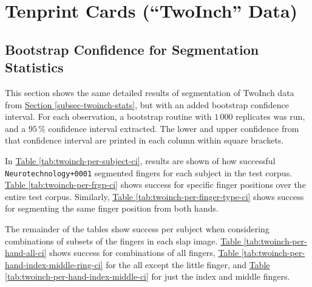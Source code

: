 \documentclass[]{article}
\begin{document}
\clearpage

\appendix


\section{\texorpdfstring{Tenprint Cards (``TwoInch''
Data)}{Tenprint Cards (TwoInch Data)}}\label{tenprint-cards-twoinch-data-1}

\subsection{Bootstrap Confidence for Segmentation
Statistics}\label{bootstrap-confidence-for-segmentation-statistics}

This section shows the same detailed results of segmentation of TwoInch
data from \protect\hyperlink{subsec-twoinch-stats}{Section
\ref{subsec-twoinch-stats}}, but with an added bootstrap confidence
interval. For each observation, a bootstrap routine with \(1\,000\)
replicates was run, and a \(95\,\%\) confidence interval extracted. The
lower and upper confidence from that confidence interval are printed in
each column within square brackets.

In \protect\hyperlink{twoinch-per-subject-ci}{Table
\ref{tab:twoinch-per-subject-ci}}, results are shown of how successful
\texttt{Neurotechnology+0001} segmented fingers for each subject in the
test corpus. \protect\hyperlink{twoinch-per-frgp-ci}{Table
\ref{tab:twoinch-per-frgp-ci}} shows success for specific finger
positions over the entire test corpus. Similarly,
\protect\hyperlink{twoinch-per-finger-type-ci}{Table
\ref{tab:twoinch-per-finger-type-ci}} shows success for segmenting the
same finger position from both hands.

The remainder of the tables show success per subject when considering
combinations of subsets of the fingers in each slap image.
\protect\hyperlink{twoinch-per-hand-all-ci}{Table
\ref{tab:twoinch-per-hand-all-ci}} shows success for combinations of all
fingers,
\protect\hyperlink{twoinch-per-hand-index-middleux5cux2520-ring-ci}{Table
\ref{tab:twoinch-per-hand-index-middle-ring-ci}} for the all except the
little finger, and
\protect\hyperlink{twoinch-per-hand-index-middle-ci}{Table
\ref{tab:twoinch-per-hand-index-middle-ci}} for just the index and
middle fingers.
\end{document}
